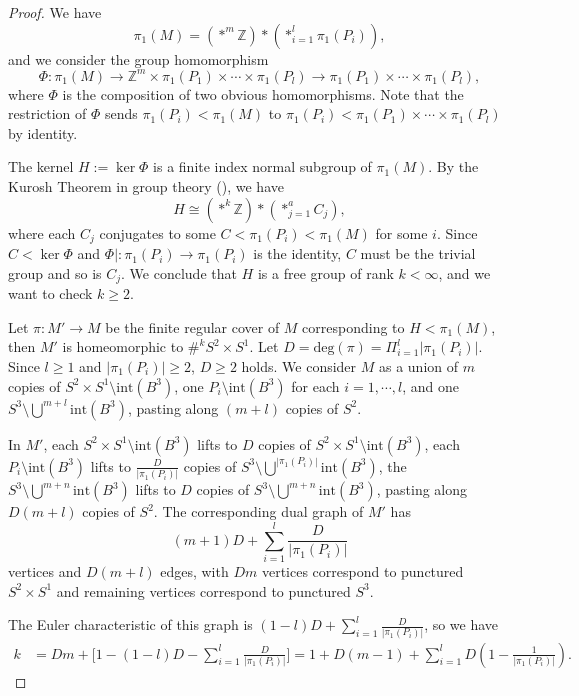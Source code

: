 \documentclass{amsart}
\newcommand{\Z}{\mathbb{Z}}
\begin{document}
 \begin{proof}
We have $$
        \pi_1(M)=(*^m \mathbb{Z})*(*_{i=1}^l \pi_1(P_i)),$$
    and we consider the group homomorphism
    $$ \Phi:\pi_1(M)\longrightarrow \Z^{m}\times \pi_1(P_1)\times\cdots\times \pi_1(P_l)\longrightarrow  \pi_1(P_1)\times\cdots\times \pi_1(P_l),$$
    where $\Phi$ is the composition of two obvious homomorphisms. Note that the restriction of $\Phi$ sends $\pi_1(P_i)<\pi_1(M)$ to $\pi_1(P_i)<\pi_1(P_1)\times \cdots \times \pi_1(P_l)$ by identity.
    
    The kernel $H:=\ker \Phi$ is a finite index normal subgroup of $\pi_1(M)$. By the Kurosh Theorem in group theory (\cite{ScW}), we have
$$H\cong  (*^k \mathbb{Z})*(*_{j=1}^a C_j),$$
where each  $C_j$ conjugates to some $C<\pi_1(P_i)<\pi_1(M)$ for some $i$. Since $C< \ker \Phi$ and  $\Phi| : \pi_1(P_i)\to  \pi_1(P_i)$ is the identity, $C$ must be the trivial group and so is $C_j$.  We conclude that $H$ is a free group of rank $k< \infty$, and we want to check $k\geq 2$.

    
    
    
Let $\pi: M'\to M$ be the finite regular cover of $M$ corresponding to $H<\pi_1(M)$, then $M'$ is homeomorphic to $\#^k S^2\times S^1$. Let $D=\text{deg}(\pi)=\Pi_{i=1}^l|\pi_1(P_i)|$. Since $l\geq 1$ and $|\pi_1(P_i)|\geq 2$, $D\geq 2$ holds. We consider $M$ as a union of $m$ copies of $S^2\times S^1\setminus \text{int}(B^3)$, one $P_i\setminus \text{int}(B^3)$ for each $i=1,\cdots,l$, and one $S^3\setminus \bigcup^{m+l}\text{int}(B^3)$, pasting along $(m+l)$ copies of $S^2$. 
 
 In $M'$, each $S^2\times S^1\setminus \text{int}(B^3)$ lifts to $D$ copies of $S^2\times S^1\setminus \text{int}(B^3)$, each $P_i\setminus \text{int}(B^3)$ lifts to $\frac{D}{|\pi_1(P_i)|}$ copies of $S^3\setminus \bigcup^{|\pi_1(P_i)|}\text{int}(B^3)$, the $S^3\setminus \bigcup^{m+n}\text{int}(B^3)$ lifts to $D$ copies of $S^3\setminus \bigcup^{m+n}\text{int}(B^3)$, pasting along $D(m+l)$ copies of $S^2$. The corresponding dual graph of $M'$ has 
 $$(m+1)D+\sum_{i=1}^l \frac{D}{|\pi_1(P_i)|}$$ 
 vertices and $D(m+l)$ edges, with $Dm$ vertices correspond to punctured $S^2\times S^1$ and remaining vertices  correspond to punctured $S^3$.
 
The Euler characteristic of this graph is $(1-l)D+\sum_{i=1}^l\frac{D}{|\pi_1(P_i)|}$, so we have 
\begin{equation}
\begin{aligned}
k&=Dm+\Big[1-(1-l)D-\sum_{i=1}^l\frac{D}{|\pi_1(P_i)|}\Big]= 1+D(m-1)+\sum_{i=1}^lD(1- \frac{1}{|\pi_1(P_i)|}).
\end{aligned}
\end{equation}


\end{proof}
\end{document}
